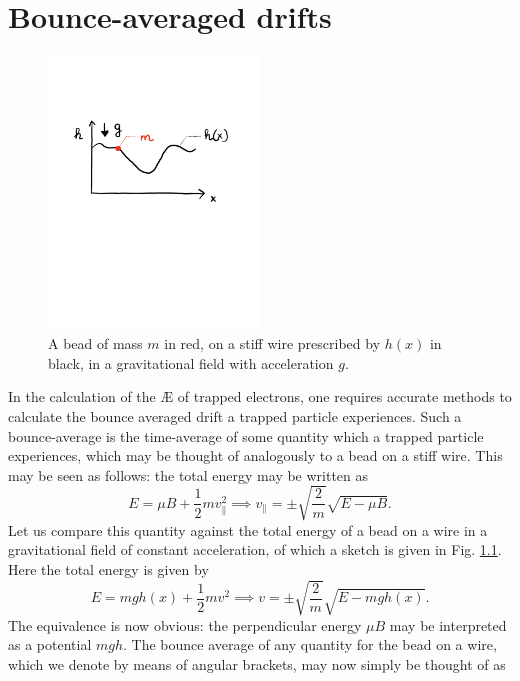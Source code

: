 \chapter[Bounce-averaged drifts]{Bounce-averaged drifts}
\label{chap: BAD}
\begin{figure}
    \centering
    \includegraphics[width=0.5\textwidth]{3_chapters/1_papers/BAD/figures/bead-on-a-wire.pdf}
    \caption{A bead of mass $m$ in red, on a stiff wire prescribed by $h(x)$ in black, in a gravitational field with acceleration $g$.}
    \label{fig:bead on a wire}
\end{figure}
In the calculation of the \AE{} of trapped electrons, one requires accurate methods to calculate the bounce averaged drift a trapped particle experiences. Such a bounce-average is the time-average of some quantity which a trapped particle experiences, which may be thought of analogously to a bead on a stiff wire. This may be seen as follows: the total energy may be written as
\begin{equation}
    E = \mu B + \frac{1}{2}mv_\parallel^2 \implies v_\parallel = \pm \sqrt{\frac{2}{m}} \sqrt{E - \mu B}.
\end{equation}
Let us compare this quantity against the total energy of a bead on a wire in a gravitational field of constant acceleration, of which a sketch is given in Fig. \ref{fig:bead on a wire}. Here the total energy is given by
\begin{equation}
    E = mg h(x) + \frac{1}{2}mv^2 \implies v = \pm \sqrt{\frac{2}{m}} \sqrt{E - mgh(x)}.
\end{equation}
The equivalence is now obvious: the perpendicular energy $\mu B$ may be interpreted as a potential $mgh$. The bounce average of any quantity for the bead on a wire, which we denote by means of angular brackets, may now simply be thought of as
